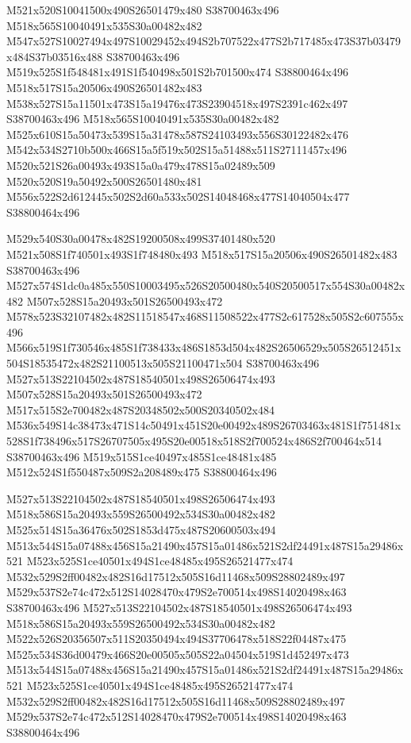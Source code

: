 \documentclass{article}
\begin{document}
\begin{multicols}{2}
M521x520S10041500x490S26501479x480 S38700463x496 M518x565S10040491x535S30a00482x482 M547x527S10027494x497S10029452x494S2b707522x477S2b717485x473S37b03479x484S37b03516x488 S38700463x496 M519x525S1f548481x491S1f540498x501S2b701500x474 S38800464x496 M518x517S15a20506x490S26501482x483 M538x527S15a11501x473S15a19476x473S23904518x497S2391c462x497 S38700463x496 M518x565S10040491x535S30a00482x482 M525x610S15a50473x539S15a31478x587S24103493x556S30122482x476 M542x534S2710b500x466S15a5f519x502S15a51488x511S27111457x496 M520x521S26a00493x493S15a0a479x478S15a02489x509 M520x520S19a50492x500S26501480x481 M556x522S2d612445x502S2d60a533x502S14048468x477S14040504x477 S38800464x496

M529x540S30a00478x482S19200508x499S37401480x520 M521x508S1f740501x493S1f748480x493 M518x517S15a20506x490S26501482x483 S38700463x496 M527x574S1dc0a485x550S10003495x526S20500480x540S20500517x554S30a00482x482 M507x528S15a20493x501S26500493x472 M578x523S32107482x482S11518547x468S11508522x477S2c617528x505S2c607555x496 M566x519S1f730546x485S1f738433x486S1853d504x482S26506529x505S26512451x504S18535472x482S21100513x505S21100471x504 S38700463x496 M527x513S22104502x487S18540501x498S26506474x493 M507x528S15a20493x501S26500493x472 M517x515S2e700482x487S20348502x500S20340502x484 M536x549S14c38473x471S14c50491x451S20e00492x489S26703463x481S1f751481x528S1f738496x517S26707505x495S20e00518x518S2f700524x486S2f700464x514 S38700463x496 M519x515S1ce40497x485S1ce48481x485 M512x524S1f550487x509S2a208489x475 S38800464x496

M527x513S22104502x487S18540501x498S26506474x493 M518x586S15a20493x559S26500492x534S30a00482x482 M525x514S15a36476x502S1853d475x487S20600503x494 M513x544S15a07488x456S15a21490x457S15a01486x521S2df24491x487S15a29486x521 M523x525S1ce40501x494S1ce48485x495S26521477x474 M532x529S2ff00482x482S16d17512x505S16d11468x509S28802489x497 M529x537S2e74c472x512S14028470x479S2e700514x498S14020498x463 S38700463x496 M527x513S22104502x487S18540501x498S26506474x493 M518x586S15a20493x559S26500492x534S30a00482x482 M522x526S20356507x511S20350494x494S37706478x518S22f04487x475 M525x534S36d00479x466S20e00505x505S22a04504x519S1d452497x473 M513x544S15a07488x456S15a21490x457S15a01486x521S2df24491x487S15a29486x521 M523x525S1ce40501x494S1ce48485x495S26521477x474 M532x529S2ff00482x482S16d17512x505S16d11468x509S28802489x497 M529x537S2e74c472x512S14028470x479S2e700514x498S14020498x463 S38800464x496


\end{multicols}
\end{document}
